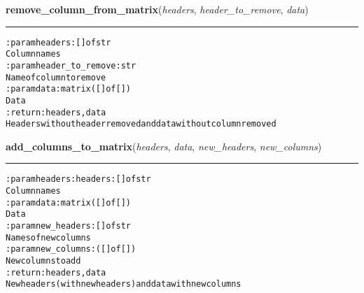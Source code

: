     \label{hal:ml:utils:matrix:remove_column_from_matrix}

    \vspace{0.5ex}

\hspace{.8\funcindent}\begin{boxedminipage}{\funcwidth}

    \raggedright \textbf{remove\_column\_from\_matrix}(\textit{headers}, \textit{header\_to\_remove}, \textit{data})

    \vspace{-1.5ex}

    \rule{\textwidth}{0.5\fboxrule}
\setlength{\parskip}{2ex}
\begin{alltt}

:param headers: [] of str
    Column names
:param header\_to\_remove: str
    Name of column to remove
:param data: matrix ([] of [])
    Data
:return: headers, data
    Headers without header removed and data without column removed
\end{alltt}

\setlength{\parskip}{1ex}
    \end{boxedminipage}

    \label{hal:ml:utils:matrix:add_columns_to_matrix}

    \vspace{0.5ex}

\hspace{.8\funcindent}\begin{boxedminipage}{\funcwidth}

    \raggedright \textbf{add\_columns\_to\_matrix}(\textit{headers}, \textit{data}, \textit{new\_headers}, \textit{new\_columns})

    \vspace{-1.5ex}

    \rule{\textwidth}{0.5\fboxrule}
\setlength{\parskip}{2ex}
\begin{alltt}

:param headers: headers: [] of str
    Column names
:param data: matrix ([] of [])
    Data
:param new\_headers: [] of str
    Names of new columns
:param new\_columns: ([] of [])
    New columns to add
:return: headers, data
    New headers (with new headers) and data with new columns
\end{alltt}

\setlength{\parskip}{1ex}
    \end{boxedminipage}

